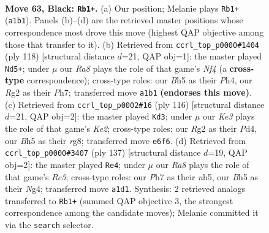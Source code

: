 \documentclass[11pt]{article}
\begin{document}
\clearpage

\begin{figure}[p]\centering
\begin{subfigure}{0.46\textwidth}\centering
\resizebox{\linewidth}{!}{%
\newchessgame
\chessboard[
  setfen={8/7p/4k3/4p2b/1K6/8/4n1r1/r7 b - - 0 63},
  showmover=false,
  pgfstyle=straightmove, color=movearrow, markmove={a1-b1}
]}
\caption{}
\end{subfigure}\hfill
\begin{subfigure}{0.46\textwidth}\centering
\resizebox{\linewidth}{!}{%
\newchessgame
\chessboard[
  setfen={8/5n1P/8/8/p4N1P/2k2P2/5K2/8 w - - 7 60},
  showmover=false,
  pgfstyle=straightmove, color=movearrow, markmove={f4-d5}
]}
\caption{}
\end{subfigure}
\\[4pt]
\begin{subfigure}{0.46\textwidth}\centering
\resizebox{\linewidth}{!}{%
\newchessgame
\chessboard[
  setfen={6r1/2k5/8/4N3/1p1P4/8/4KP2/8 w - - 2 59},
  showmover=false,
  pgfstyle=straightmove, color=movearrow, markmove={e2-d3}
]}
\caption{}
\end{subfigure}\hfill
\begin{subfigure}{0.46\textwidth}\centering
\resizebox{\linewidth}{!}{%
\newchessgame
\chessboard[
  setfen={8/8/2k5/2p4N/2r3n1/3R4/1K6/8 b - - 7 69},
  showmover=false,
  pgfstyle=straightmove, color=movearrow, markmove={c4-e4}
]}
\caption{}
\end{subfigure}
\caption{\textbf{Move 63, Black: \texttt{Rb1+}.} (a) Our position; Melanie plays \texttt{Rb1+} (\texttt{a1b1}). Panels (b)--(d) are the retrieved master positions whose correspondence most drove this move (highest QAP objective among those that transfer to it). (b) Retrieved from \texttt{ccrl\_top\_p0000\#1404} (ply 118) [structural distance $d$=21, QAP obj=1]: the master played \texttt{Nd5+}; under $\mu$ our \emph{Ra8} plays the role of that game's \emph{Nf4} (a \textbf{cross-type} correspondence); cross-type roles: our \emph{B}h5 as their \emph{P}h4, our \emph{R}g2 as their \emph{P}h7; transferred move \texttt{a1b1} \textbf{(endorses this move)}. (c) Retrieved from \texttt{ccrl\_top\_p0002\#16} (ply 116) [structural distance $d$=21, QAP obj=2]: the master played \texttt{Kd3}; under $\mu$ our \emph{Ke3} plays the role of that game's \emph{Ke2}; cross-type roles: our \emph{R}g2 as their \emph{P}d4, our \emph{B}h5 as their \emph{r}g8; transferred move \texttt{e6f6}. (d) Retrieved from \texttt{ccrl\_top\_p0000\#3407} (ply 137) [structural distance $d$=19, QAP obj=2]: the master played \texttt{Re4}; under $\mu$ our \emph{Ra8} plays the role of that game's \emph{Rc5}; cross-type roles: our \emph{P}h7 as their \emph{n}h5, our \emph{B}h5 as their \emph{N}g4; transferred move \texttt{a1d1}. Synthesis: 2 retrieved analogs transferred to \texttt{Rb1+} (summed QAP objective 3, the strongest correspondence among the candidate moves); Melanie committed it via the \texttt{search} selector.}
\label{fig:thought-m125}
\end{figure}
\end{document}
